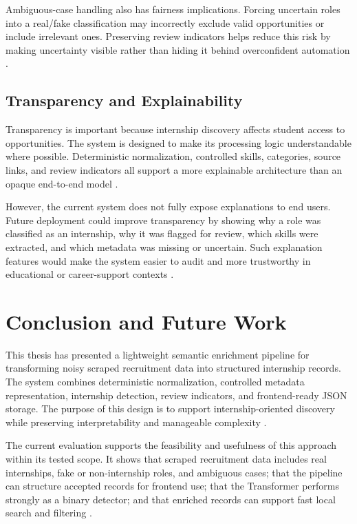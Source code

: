 Ambiguous-case handling also has fairness implications. Forcing uncertain roles into a
real/fake classification may incorrectly exclude valid opportunities or include irrelevant ones.
Preserving review indicators helps reduce this risk by making uncertainty visible rather than
hiding it behind overconfident automation \cite{krippendorff2004content, rigotti2024fairness}.

\subsection{Transparency and Explainability}

Transparency is important because internship discovery affects student access to
opportunities. The system is designed to make its processing logic understandable where possible.
Deterministic normalization, controlled skills, categories, source links, and review indicators
all support a more explainable architecture than an opaque end-to-end model \cite{hunkenschroer2022ethics, bass2012software}.

However, the current system does not fully expose explanations to end users. Future
deployment could improve transparency by showing why a role was classified as an
internship, why it was flagged for review, which skills were extracted, and which metadata
was missing or uncertain. Such explanation features would make the system easier to audit
and more trustworthy in educational or career-support contexts \cite{rigotti2024fairness}.


\section{Conclusion and Future Work}

This thesis has presented a lightweight semantic enrichment pipeline for transforming noisy
scraped recruitment data into structured internship records. The system combines
deterministic normalization, controlled metadata representation, internship detection, review
indicators, and frontend-ready JSON storage.
The purpose of this design is to support
internship-oriented discovery while preserving interpretability and manageable complexity \cite{hevner2004design, peffers2007design, batini2009methodologies}.

The current evaluation supports the feasibility and usefulness of this approach within its
tested scope.
It shows that scraped recruitment data includes real internships, fake or
non-internship roles, and ambiguous cases; that the pipeline can structure accepted records for
frontend use; that the Transformer performs strongly as a binary detector; and that enriched
records can support fast local search and filtering \cite{wohlin2012experimentation, sokolova2009systematic, jain1991art}.


